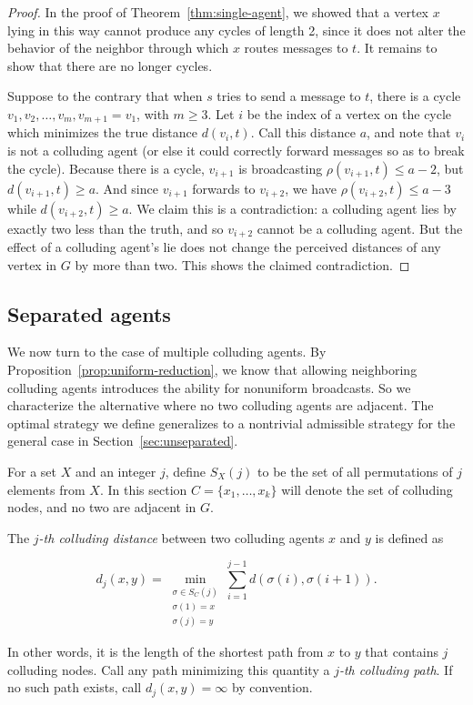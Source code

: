 \documentclass{comnet}
\providecommand{\DIFadd}[1]{{\protect\color{blue}\uwave{#1}}} %
\providecommand{\DIFaddbegin}{} %
\providecommand{\DIFaddend}{} %
\begin{document}
\begin{proof}

In the proof of Theorem~\ref{thm:single-agent}, we showed that a vertex $x$
lying in this way cannot produce any cycles of length 2, since it does not
alter the behavior of the neighbor through which $x$ routes messages to $t$. It
remains to show that there are no longer cycles.

Suppose to the contrary that when $s$ tries to send a message to $t$, there is
a cycle $v_1, v_2, \dots, v_m, v_{m+1} = v_1$, with $m \geq 3$. Let $i$ be the
index of a vertex on the cycle which minimizes the true distance $d(v_i, t)$.
Call this distance $a$, and note that $v_i$ is not a colluding agent (or else
it could correctly forward messages so as to break the cycle). Because there is
a cycle, $v_{i+1}$ is broadcasting $\rho(v_{i+1}, t) \leq a-2$, but $d(v_{i+1},
t) \geq a$. And since $v_{i+1}$ forwards to $v_{i+2}$, we have $\rho(v_{i+2},
t) \leq a-3$ while $d(v_{i+2}, t) \geq a$. We claim this is a contradiction: a
colluding agent lies by exactly two less than the truth, and so $v_{i+2}$
cannot be a colluding agent. But the effect of a colluding agent's lie does not
change the perceived distances of any vertex in $G$ by more than two. This
shows the claimed contradiction.
\end{proof}

\subsection{Separated agents}\label{sec:separated}

We now turn to the case of multiple colluding agents. By
Proposition~\ref{prop:uniform-reduction}, we know that allowing neighboring
colluding agents introduces the ability for nonuniform broadcasts. So we
characterize the alternative where no two colluding agents are adjacent. The
optimal strategy we define generalizes to a nontrivial admissible strategy for
the general case in Section~\ref{sec:unseparated}.

For a set $X$ \DIFaddbegin \DIFadd{of integers }\DIFaddend and an integer $j$, define $S_X(j)$ to be the set of all
permutations of $j$ elements from $X$. In this section $C = \{ x_1, \dots, x_k
\}$ will denote the set of colluding nodes, and no two are adjacent in $G$.

\begin{definition}
The \emph{$j$-th colluding distance} between two colluding agents $x$ and $y$
is defined as

\[
   d_j(x, y)= \min_{\substack{\sigma \in S_C(j) \\ \sigma(1) = x \\ \sigma(j) =
y}}
         \sum_{i=1}^{j-1} d(\sigma(i),\sigma(i+1)).
\]

In other words, it is the length of the shortest path from $x$ to $y$ that
contains $j$ colluding nodes. Call any path minimizing this quantity a
\emph{$j$-th colluding path}. If no such path exists, call $d_j(x,y) = \infty$
by convention.  \end{definition}
\end{document}
